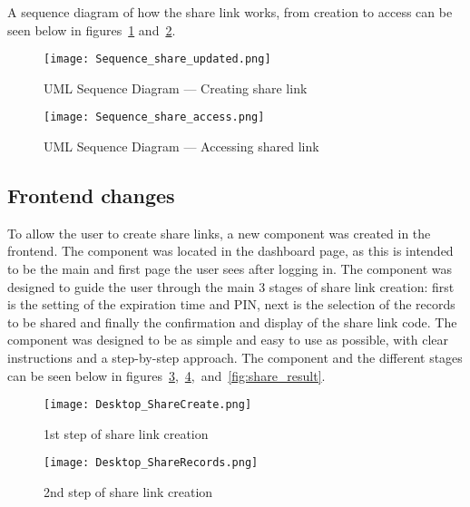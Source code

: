 A sequence diagram of how the share link works, from creation to access can be seen below in figures~\ref{fig:sequence_share_updated} and~\ref{fig:sequence_share_access}.

\begin{figure}[htbp]
  \centering
  \texttt{[image: Sequence\_share\_updated.png]}
  \caption{UML Sequence Diagram --- Creating share link}\label{fig:sequence_share_updated}
\end{figure}

\begin{figure}[htbp]
  \centering
  \texttt{[image: Sequence\_share\_access.png]}
  \caption{UML Sequence Diagram --- Accessing shared link}\label{fig:sequence_share_access}
\end{figure}

\FloatBarrier{}

\subsection{Frontend changes}

To allow the user to create share links, a new component was created in the frontend. The component was located in the dashboard page, as this is intended to be the main and first page the user sees after logging in. The component was designed to guide the user through the main 3 stages of share link creation: first is the setting of the expiration time and PIN, next is the selection of the records to be shared and finally the confirmation and display of the share link code. The component was designed to be as simple and easy to use as possible, with clear instructions and a step-by-step approach. The component and the different stages can be seen below in figures~\ref{fig:share_create},~\ref{fig:share_records},~and~\ref{fig:share_result}.

\begin{figure}[htbp]
  \centering
  \texttt{[image: Desktop\_ShareCreate.png]}
  \caption{1st step of share link creation}\label{fig:share_create}
\end{figure}

\begin{figure}[htbp]
  \centering
  \texttt{[image: Desktop\_ShareRecords.png]}
  \caption{2nd step of share link creation}\label{fig:share_records}
\end{figure}

